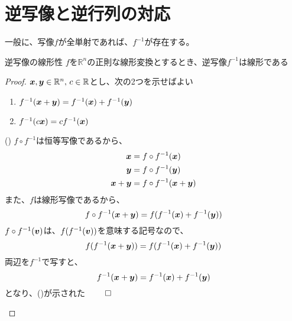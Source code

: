 \documentclass[../../../topic_linear-algebra]{subfiles}
\begin{document}
\sectionline
\section{逆写像と逆行列の対応}

一般に、写像$f$が全単射であれば、$f^{-1}$が存在する。

\begin{theorem*}{逆写像の線形性}
  $f$を$\mathbb{R}^n$の正則な線形変換とするとき、逆写像$f^{-1}$は線形である
\end{theorem*}

\begin{proof}
  $\vb*{x},\vb*{y} \in \mathbb{R}^n,\, c \in \mathbb{R}$とし、次の2つを示せばよい
  \begin{enumerate}[label=\romanlabel]
    \item $f^{-1}(\vb*{x} + \vb*{y}) = f^{-1}(\vb*{x}) + f^{-1}(\vb*{y})$
    \item $f^{-1}(c\vb*{x}) = c f^{-1}(\vb*{x})$
  \end{enumerate}

  \begin{subpattern}{()}
    $f \circ f^{-1}$は恒等写像であるから、
    \begin{align*}
      \vb*{x}           & = f \circ f^{-1}(\vb*{x})           \\
      \vb*{y}           & = f \circ f^{-1}(\vb*{y})           \\
      \vb*{x} + \vb*{y} & = f \circ f^{-1}(\vb*{x} + \vb*{y})
    \end{align*}
    また、$f$は線形写像であるから、
    \begin{equation*}
      f \circ f^{-1}(\vb*{x} + \vb*{y}) = f(f^{-1}(\vb*{x}) + f^{-1}(\vb*{y}))
    \end{equation*}
    $f \circ f^{-1}(\vb*{v})$は、$f (f^{-1}(\vb*{v}))$を意味する記号なので、
    \begin{equation*}
      f(f^{-1}(\vb*{x}+\vb*{y})) = f(f^{-1}(\vb*{x}) + f^{-1}(\vb*{y}))
    \end{equation*}
    両辺を$f^{-1}$で写すと、
    \begin{equation*}
      f^{-1}(\vb*{x} + \vb*{y}) = f^{-1}(\vb*{x}) + f^{-1}(\vb*{y})
    \end{equation*}
    となり、()が示された $\qed$
  \end{subpattern}


\end{proof}
\end{document}
